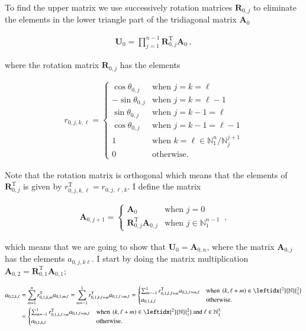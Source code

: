 \documentclass[11pt,english,a4paper]{article}
\begin{document}
\begin{flushleft}
To find the upper matrix we use successively rotation matrices $\textbf{R}_{0,j}$ to eliminate the elements in the lower triangle part of the tridiagonal matrix $\textbf{A}_0$ 

\begin{align*}
\textbf{U}_0 = \prod_{j=1}^{n-1} \textbf{R}_{0,j}^{\text{T}} \textbf{A}_0 \,,
\end{align*}

where the rotation matrix $\textbf{R}_{0,j}$ has the elements

\begin{align*}
r_{0,j,k,\ell} = \begin{cases} \cos\theta_{0,j} & \text{when } j=k=\ell \\ -\sin\theta_{0,j} & \text{when } j=k=\ell-1 \\ \sin\theta_{0,j} & \text{when } j=k-1=\ell \\ \cos\theta_{0,j} & \text{when } j = k-1 = \ell-1 \\ 1 & \text{when } k=\ell\in\mathbb{N}_1^n / \mathbb{N}_j^{j+1}  \\ 0 & \text{otherwise.}\end{cases}
\end{align*}

Note that the rotation matrix is orthogonal which means that the elements of $\textbf{R}_{0,j}^{\text{T}}$ is given by $r_{0,j,k,\ell}^{\text{T}} = r_{0,j,\ell,k}$. I define the matrix

\begin{align*}
\textbf{A}_{0,j+1} = \begin{cases}\textbf{A}_0 &\text{when } j=0 \\ \textbf{R}_{0,j}^{\text{T}}\textbf{A}_{0,j} & \text{when } j\in\mathbb{N}_1^{n-1} \end{cases} \,,
\end{align*}

which means that we are going to show that $\textbf{U}_0 = \textbf{A}_{0,n}$, where the matrix $\textbf{A}_{0,j}$ has the elements $a_{0,j,k\ell}$. I start by doing the matrix multiplication $\textbf{A}_{0,2} = \textbf{R}_{0,1}^{\text{T}}\textbf{A}_{0,1}$;

\begin{align*}
a_{0,2,k,\ell} &= \sum_{m=1}^n r_{0,1,k,m}^{\text{T}} a_{0,1,m,\ell} = \sum_{m=-1}^1 r_{0,1,k,\ell+m}^{\text{T}} a_{0,1,\ell+m,\ell}
= \begin{cases} \sum_{m=-1}^1 r_{0,1,k,\ell+m}^{\text{T}} a_{0,1,\ell+m,\ell} & \text{when } \p{k,\ell+m}\in{\leftidx{^2}{\mathbb{N}}{_1^2}}\\ a_{0,1,k,\ell} & \text{otherwise.}\end{cases} 
\\
&= \begin{cases} \sum_{m=-1}^1 r_{0,1,k,\ell+m}^{\text{T}} a_{0,1,\ell+m,\ell} & \text{when } \p{k,\ell+m}\in{\leftidx{^2}{\mathbb{N}}{_1^2}} \text{ and } \ell \in\mathbb{N}_1^3\\ a_{0,1,k,\ell} & \text{otherwise.}\end{cases}
\end{align*}


\end{flushleft}
\end{document}
